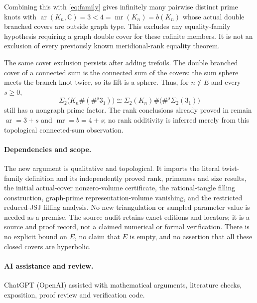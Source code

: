 \documentclass[11pt]{article}
\newcommand{\Sig}{\Sigma_2}
\newcommand{\mr}{\operatorname{mr}}
\newcommand{\ar}{\operatorname{ar}}
\begin{document}
Combining this with \eqref{eq:family} gives infinitely many pairwise
distinct prime knots with $\ar(K_n,\mathbb C)=3<4=\mr(K_n)=b(K_n)$
whose actual double branched covers are outside graph type. This
excludes any equality-family hypothesis requiring a graph double
cover for these cofinite members. It is not an exclusion of every
previously known meridional-rank equality theorem.

The same cover exclusion persists after adding trefoils. The double
branched cover of a connected sum is the connected sum of the covers:
the sum sphere meets the branch knot twice, so its lift is a sphere.
Thus, for $n\notin E$ and every $s\ge0$,
\[
 \Sig\bigl(K_n\#(\#^s3_1)\bigr)
       \cong\Sig(K_n)\#\bigl(\#^s\Sig(3_1)\bigr)
\]
still has a nongraph prime factor. The rank conclusions already
proved in \cite[Corollary \texttt{cor:sums}]{family} remain
$\ar=3+s$ and $\mr=b=4+s$; no rank additivity is inferred merely
from this topological connected-sum observation.

\paragraph{Dependencies and scope.}
The new argument is qualitative and topological. It imports the
literal twist-family definition and its independently proved rank,
primeness and size results, the initial actual-cover nonzero-volume
certificate, the rational-tangle filling construction, graph-prime
representation-volume vanishing, and the restricted reduced-JSJ
filling analysis. No new triangulation or sampled parameter value is
needed as a premise. The source audit retains exact editions and
locators; it is a source and proof record, not a claimed numerical
or formal verification. There is no explicit bound on $E$, no claim
that $E$ is empty, and no assertion that all these closed covers are
hyperbolic.

\paragraph{AI assistance and review.}
ChatGPT (OpenAI) assisted with mathematical arguments, literature checks,
exposition, proof review and verification code.
\end{document}

